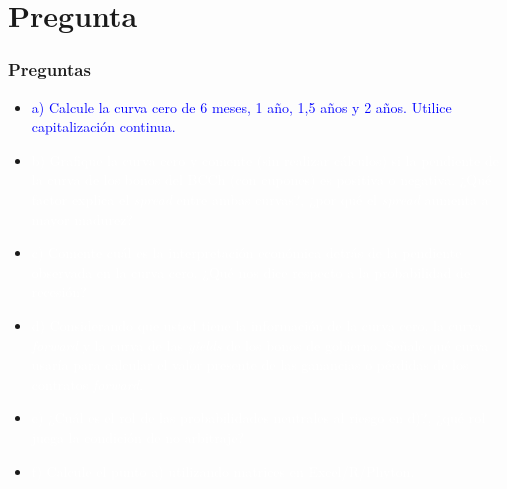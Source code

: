 \documentclass{beamer}
\begin{document}
\section{Pregunta }
  \begin{frame}
    \frametitle{Preguntas}
    \begin{itemize}
      \scriptsize
      \item {\Large\textcolor{blue}{a) Calcule la curva cero de 6 meses, 1 año, 1,5 años y 2 años. Utilice capitalización continua.}}
      \vspace{3pt}
      \item {\textcolor{white}{b) Grafique la curva cero y comente (sin realizar cálculos) si la pendiente de la curva de los bonos del BCCh (con cupones) es positiva o negativa. ¿Qué factor explica el \textit{spread} entre ambas curvas?, ¿por qué el \textit{spread} aumenta a mayor madurez?}}
      \vspace{3pt}
      \item {\textcolor{white}{c) Comente cuál es la interpretación económica detrás de la pendiente observada en la curva cero. ¿Qué nos dice respecto a la probabilidad de recesión?}}
      \vspace{3pt}
      \item {\textcolor{white}{d) Considerando que usted tiene la información de la curva cero, la curva \textit{forward} y la curva de las \textit{yields} de los bonos de gobierno. Señale qué curva usaría para calcular el valor presente de las ganancias o pérdidas de los contratos \textit{forward}.}}
      \vspace{3pt}
      \item {\textcolor{white}{e) ¿Cuál es el rol de las probabilidades neutrales al riesgo en d)?, ¿qué rol juega la condición de no arbitraje?}}
      \vspace{3pt}
      \item {\textcolor{white}{f) Calcule el punto a) utilizando matrices en Excel/R/Phyton.}}
      \vspace{3pt}
    \end{itemize}
  \end{frame}
\end{document}
